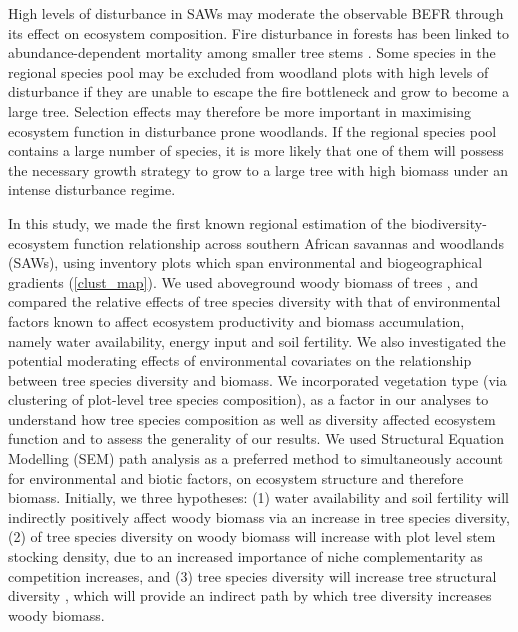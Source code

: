 \documentclass[11pt,a4paper]{article}
\begin{document}
High levels of disturbance in SAWs may moderate the observable BEFR through its effect on ecosystem composition. Fire disturbance in forests has been linked to abundance-dependent mortality among smaller tree stems \citep{Roques2001, Staver2009, Bond2005}. Some species in the regional species pool may be excluded from woodland plots with high levels of disturbance if they are unable to escape the fire bottleneck and grow to become a large tree. Selection effects may therefore be more important in maximising ecosystem function in disturbance prone woodlands. If the regional species pool contains a large number of species, it is more likely that one of them will possess the necessary growth strategy to grow to a large tree with high biomass under an intense disturbance regime. 

In this study, we made the first known regional estimation of the biodiversity-ecosystem function relationship across southern African savannas and woodlands (SAWs), using inventory plots which span environmental and biogeographical gradients (\autoref{clust_map}). We used aboveground woody biomass of trees , and compared the relative effects of tree species diversity with that of environmental factors known to affect ecosystem productivity and biomass accumulation, namely water availability, energy input and soil fertility. We also investigated the potential moderating effects of environmental covariates on the relationship between tree species diversity and biomass. We incorporated vegetation type (via clustering of plot-level tree species composition), as a factor in our analyses to understand how tree species composition as well as diversity affected ecosystem function and to assess the generality of our results. We used Structural Equation Modelling (SEM)  path analysis as a preferred method to simultaneously account for environmental and biotic factors,  on ecosystem structure and therefore biomass. Initially, we  three hypotheses: (1) water availability and soil fertility will indirectly positively affect woody biomass via an increase in tree species diversity, (2)  of tree species diversity on woody biomass will increase with plot level stem stocking density, due to an increased importance of niche complementarity as competition increases, and (3) tree species diversity will increase tree structural diversity , which will provide an indirect path by which tree diversity increases woody biomass.
\end{document}
